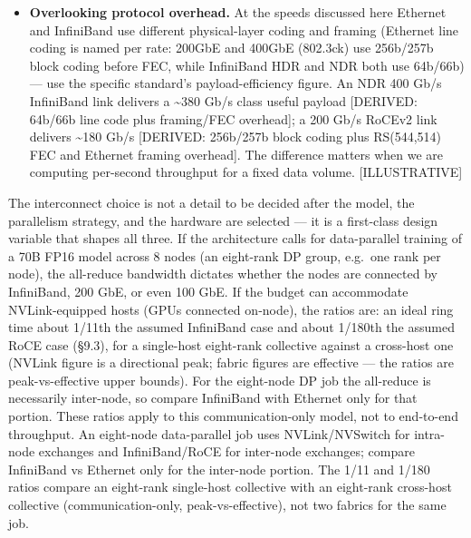\begin{itemize}
  is 5--10× that of Ethernet \mbox{{[}ILLUSTRATIVE{]}}. If the communication
  time is acceptable on RoCEv2, the cheaper fabric may be the better
  architectural choice.
\item
  \textbf{Overlooking protocol overhead.} At the speeds discussed here
  Ethernet and InfiniBand use different physical-layer coding and
  framing (Ethernet line coding is named per rate: 200GbE and 400GbE
  (802.3ck) use 256b/257b block coding before FEC, while InfiniBand HDR
  and NDR both use 64b/66b) --- use the specific standard's
  payload-efficiency figure. An NDR 400 Gb/s InfiniBand link delivers a
  \textasciitilde380 Gb/s class useful payload {[}DERIVED: 64b/66b line
  code plus framing/FEC overhead{]}; a 200 Gb/s RoCEv2 link delivers
  \textasciitilde180 Gb/s {[}DERIVED: 256b/257b block coding plus
  RS(544,514) FEC and Ethernet framing overhead{]}. The difference
  matters when we are computing per-second throughput for a fixed data
  volume. \mbox{{[}ILLUSTRATIVE{]}}
\end{itemize}

\label{architecture-consequence}


The interconnect choice is not a detail to be decided after the model,
the parallelism strategy, and the hardware are selected --- it is a
first-class design variable that shapes all three. If the architecture
calls for data-parallel training of a 70B FP16 model across 8 nodes (an
eight-rank DP group, e.g.~one rank per node), the all-reduce bandwidth
dictates whether the nodes are connected by InfiniBand, 200 GbE, or even
100 GbE. If the budget can accommodate NVLink‑equipped hosts (GPUs
connected on‑node), the ratios are: an ideal ring time about 1/11th the
assumed InfiniBand case and about 1/180th the assumed RoCE case (§9.3),
for a single-host eight-rank collective against a cross-host one (NVLink
figure is a directional peak; fabric figures are effective --- the
ratios are peak-vs-effective upper bounds). For the eight-node DP job
the all-reduce is necessarily inter-node, so compare InfiniBand with
Ethernet only for that portion. These ratios apply to this
communication-only model, not to end-to-end throughput. An eight-node
data-parallel job uses NVLink/NVSwitch for intra-node exchanges and
InfiniBand/RoCE for inter-node exchanges; compare InfiniBand vs Ethernet
only for the inter-node portion. The 1/11 and 1/180 ratios compare an
eight-rank single-host collective with an eight-rank cross-host
collective (communication-only, peak-vs-effective), not two fabrics for
the same job.

